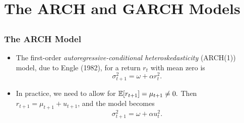 \section[ARCH/GARCH]{The ARCH and GARCH Models}\subsection*{}


\begin{frame}%
\frametitle{The ARCH Model}
\begin{itemize}
\item The first-order \emph{\color{red}%
autoregressive-conditional heteroskedasticity} (ARCH(1))  model, due to Engle (1982), for a return $%
r_{t}$ with mean zero is
\begin{equation*}
\sigma^2_{t+1}=\omega +\alpha r_{t}^{2}.
\end{equation*}
\item In practice, we need to allow for ${\mathbb E}[r_{t+1}]=\mu _{t+1}\neq 0.$
Then $r_{t+1}=\mu _{t+1}+u_{t+1}$, and the model becomes
\begin{equation*}
\sigma _{t+1}^{2}=\omega +\alpha
u_{t}^{2}.
\end{equation*}
\end{itemize}
\end{frame}%

